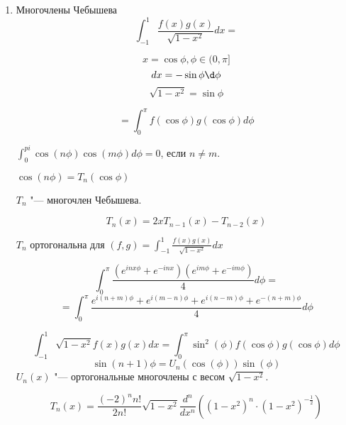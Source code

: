 \begin{enumerate}
\begin{proof}
    $$\frac{d^n}{dx^n}(x^2 - 1)^n|_{x = 1} = \frac{d^n}{dx^n}(x - 1)^n(x + 1)^n|_{x = 1} = \sum_{k = 0}\binom{n}{k}\frac{d^k}{dx^k}(x - 1)^n\frac{d^{n - k}}{dx^{n - k}}(x + 1)^n|_{x = 1} = $$
    $$ \binom{n}{k}(\frac{d^n}{dx^n}(x - 1)^n)(x + 1)^n|_{x = 1} = n!(1 + 1)^n = 2^nn!$$

    $$P_n(1) = \frac{1}{2^nn!}2^nn! = 1$$
    \end{proof}

    \begin{theorem}
    \begin{enumerate}
    \item
    $$\sum_{n = 0}^{\infty}P_n(x)z^n = \frac{1}{\sqrt{1 - 2xz + z^2}}$$
    $x \in [-1,1]$ z в некоторой окрестности 0.
    \item
    $$\sum_{n = 0}^{\infty}P_n(1)z^n = \frac{1}{1 - z} = 1 + z + z^2 + \cdots $$
    $$P_n(1) = 1$$
    \item
    $$\sum_{n = 0}^{\infty}P_n(-1)z^n = \frac{1}{1 + z} = 1 - z + z^2 - \cdots$$

    $$P_n(-1) = (-1)^n $$
    \end{enumerate}
    \end{theorem}
\item Многочлены Чебышева
$$\int_{-1}^{1} \frac{f(x)g(x)}{\sqrt{1 - x^2}}dx=$$

$$x = \cos \phi, \phi \in (0, \pi]$$
$$dx = -\sin \phi \d\phi $$
$$\sqrt{1 - x^2} = \sin \phi$$

$$= \int_{0}^{\pi}f(\cos \phi)g(\cos \phi) d \phi$$

$\int_{0}^{pi}\cos(n\phi)\cos(m\phi) d \phi = 0$, если $n \ne m$.

$\cos(n \phi) = T_n(\cos \phi)$

$T_n$ "--- многочлен Чебышева. 

$$T_n(x) = 2xT_{n - 1}(x) - T_{n - 2}(x)$$

$T_n$ ортогональна для $(f, g) = \int_{-1}^{1}\frac{f(x)g(x)}{\sqrt{1 - x^2}}dx$

$$\int_{0}^{\pi}\frac{(e^{inx\phi} + e^{-inx})(e^{im\phi} + e^{-im\phi})}{4} d\phi =  $$
$$= \int_{0}^{\pi}\frac{e^{i(n + m)\phi} + e^{i(m - n) \phi} + e^{i(n - m) \phi} + e^{-(n + m)\phi}}{4}d\phi $$

$$\int_{-1}^{1}\sqrt{1 - x^2}f(x)g(x)dx = \int_{0}^{\pi}\sin^2(\phi)f(\cos \phi)g(\cos \phi) d \phi$$
$$\sin(n + 1)\phi= U_n(\cos(\phi))\sin(\phi)$$
$U_n(x)$ "--- ортогональные многочлены с весом $\sqrt{1 - x^2}$.

$$T_n(x) = \frac{(-2)^nn!}{2n!}\sqrt{1 - x^2}\frac{d^n}{dx^n}((1 - x^2)^n \cdot (1 - x^2)^{-\frac{1}{2}}) $$


\end{enumerate}
